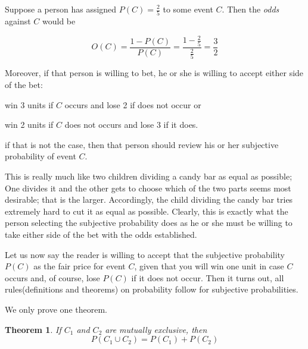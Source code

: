 \documentclass[a4paper]{book}
\newtheorem{theorem}{Theorem}[section]
\begin{document}
	Suppose a person has assigned $P(C) = \frac{2}{5}$ to some event $C$.
	Then the \textit{odds} against $C$ would be

	\begin{displaymath}
		O(C) = \frac{1 - P(C)}{P(C)} = \frac{1 - \frac{2}{5}}{\frac{2}{5}} =
		\frac{3}{2}
	\end{displaymath}

	Moreover, if that person is willing to bet, he or she is willing to
	accept either side of the bet: 
	\begin{inparaenum}
		\item win 3 units if $C$ occurs and lose 2 if does not occur or 
		\item win 2 units if $C$ does not occurs and lose 3 if it does.
	\end{inparaenum}
	if that is not the case, then that person should review his or her
	subjective probability of event $C$.

	This is really much like two children dividing a candy bar as equal as
	possible; One divides it and the other gets to choose which of the two
	parts seems most desirable; that is the larger. Accordingly, the child
	dividing the candy bar tries extremely hard to cut it as equal as
	possible. Clearly, this is exactly what the person selecting the
	subjective probability does as he or she must be willing to take
	either side of the bet with the odds established.

	Let us now say the reader is willing to accept that the subjective
	probability $P(C)$ as the fair price for event $C$, given that you
	will win one unit in case $C$ occurs and, of course, lose $P(C)$ if it
	does not occur. Then it turns out, all rules(definitions and theorems)
	on probability follow for subjective probabilities.

	We only prove one theorem.

	\begin{theorem}
		If $C_1$ and $C_2$ are mutually exclusive, then
		\begin{displaymath}
			P(C_1 \cup C_2) = P(C_1) + P(C_2)
		\end{displaymath}
	\end{theorem}
\end{document}
